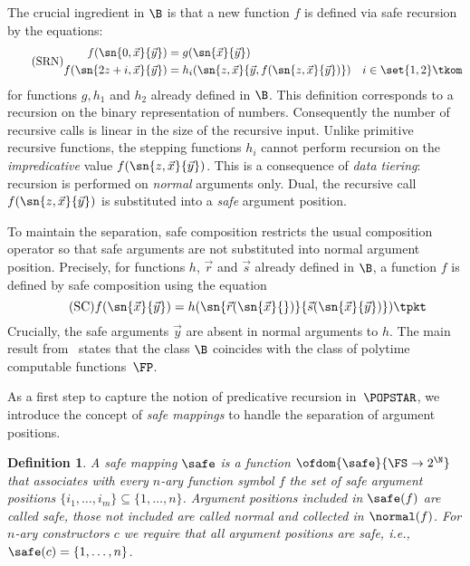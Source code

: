 \documentclass{LMCS}
\newtheorem{definition}[thm]{Definition}
\begin{document}
The crucial ingredient in $\B$ is that 
a new function $f$ is defined via safe recursion by the equations:
\begin{equation}
\label{scheme:srn} 
\tag{\ensuremath{\mathrm{SRN}}}
\begin{aligned}
  f(\sn{0,\vec{x}}{\vec{y}}) & = g(\sn{\vec{x}}{\vec{y}}) 
     \\
  f(\sn{2z + i,\vec{x}}{\vec{y}}) & = 
   h_i(\sn{z,\vec{x}}{\vec{y},f(\sn{z,\vec{x}}{\vec{y}})})\quad i \in \set{1,2}
   \tkom
\end{aligned}
\end{equation}
for functions $g,h_1$ and $h_2$ already defined in $\B$.
This definition corresponds to a recursion on the binary representation
of numbers. Consequently the number of recursive calls is linear in the size of the recursive input. 
Unlike primitive recursive functions, the
stepping functions $h_i$ cannot perform recursion on the \emph{impredicative} value $f(\sn{z,\vec{x}}{\vec{y}})$.
This is a consequence of \emph{data tiering}: recursion is performed on \emph{normal} arguments only. 
Dual, the recursive call $f(\sn{z,\vec{x}}{\vec{y}})$ is substituted into a \emph{safe} argument position.

To maintain the separation, safe composition restricts the usual composition operator
so that safe arguments are not substituted into normal argument position.
Precisely, for functions $h$, $\vec{r}$ and $\vec{s}$ already defined in $\B$, 
a function $f$ is defined by safe composition using the equation
\begin{equation}\label{scheme:sc} \tag{\ensuremath{\mathrm{SC}}}
  f(\sn{\vec{x}}{\vec{y}}) = h(\sn{\vec{r}(\sn{\vec{x}}{})}{\vec{s}(\sn{\vec{x}}{\vec{y}})}) \tpkt
\end{equation}
Crucially, the safe arguments $\vec{y}$ are absent in normal arguments to $h$.
The main result from~\cite{BC92} states that the class $\B$ coincides with
the class of polytime computable functions~$\FP$. 

As a first step to capture the notion of predicative recursion in~$\POPSTAR$, 
we introduce the concept of \emph{safe mappings} to
handle the separation of argument positions.
\begin{definition}\label{d:safemapping}
  A \emph{safe mapping} $\safe$ is a function 
  $\ofdom{\safe}{\FS \to 2^\N}$ that associates 
  with every $n$-ary function symbol $f$ the set of \emph{safe argument positions} 
  $\{i_1, \dots , i_m\} \subseteq \{1,\dots,n\}$.
  Argument positions included in $\safe(f)$ are called \emph{safe},
  those not included are 
  called \emph{normal} and collected in $\normal(f)$.
  For $n$-ary constructors $c$ 
  we require that all argument positions are safe, 
  i.e., $\safe(c) = \{1,\dots,n\}$.
\end{definition}
\end{document}
